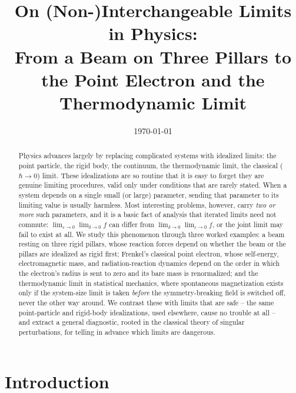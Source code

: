 \documentclass[11pt]{article}
\title{On (Non-)Interchangeable Limits in Physics:\\
\large From a Beam on Three Pillars to the Point Electron and the Thermodynamic Limit}
\author{}
\date{\today}
\begin{document}
\maketitle

\begin{abstract}
\noindent
Physics advances largely by replacing complicated systems with idealized limits: the point particle, the rigid body, the continuum, the thermodynamic limit, the classical ($\hbar\to0$) limit. These idealizations are so routine that it is easy to forget they are genuine limiting procedures, valid only under conditions that are rarely stated. When a system depends on a single small (or large) parameter, sending that parameter to its limiting value is usually harmless. Most interesting problems, however, carry \emph{two or more} such parameters, and it is a basic fact of analysis that iterated limits need not commute: $\lim_{\varepsilon\to0}\lim_{\delta\to0} f$ can differ from $\lim_{\delta\to0}\lim_{\varepsilon\to0} f$, or the joint limit may fail to exist at all. We study this phenomenon through three worked examples: a beam resting on three rigid pillars, whose reaction forces depend on whether the beam or the pillars are idealized as rigid first; Frenkel's classical point electron, whose self-energy, electromagnetic mass, and radiation-reaction dynamics depend on the order in which the electron's radius is sent to zero and its bare mass is renormalized; and the thermodynamic limit in statistical mechanics, where spontaneous magnetization exists only if the system-size limit is taken \emph{before} the symmetry-breaking field is switched off, never the other way around. We contrast these with limits that are safe -- the same point-particle and rigid-body idealizations, used elsewhere, cause no trouble at all -- and extract a general diagnostic, rooted in the classical theory of singular perturbations, for telling in advance which limits are dangerous.
\end{abstract}

\tableofcontents

\section{Introduction}
\end{document}
